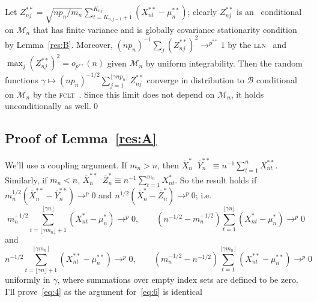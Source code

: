 \documentclass[12pt]{article}
\theoremstyle{definition}
\DeclareMathOperator{\eqd}{\overset{d}{=}}
\newcommand{\fclt}{\textsc{fclt}}
\newcommand{\lln}{\textsc{lln}}
\begin{document}
Let $Z_{nj}^{**} = \sqrt{n p_n/ m_n} \sum_{t = K_{n,j-1} + 1}^{K_{nj}}
(X_{nt}^{**} - \mu_n^{**})$; clearly $Z_{nj}^{**}$ is an \mds\
conditional on $\mathcal{M}_n$ that has finite variance and is
globally covariance stationarity condition by Lemma~\ref{res:B}.
Moreover, $(n p_n)^{-1} \sum_j (Z_{nj}^{**})^2 \to^{p^{**}} 1$ by the
\lln\ \citep[e.g.][Theorem~19.7]{Dav:94} and $\max_j (Z_{nj}^{**})^2 =
o_{p^{**}}(n)$ given $\mathcal{M}_n$ by uniform integrability.  Then
the random functions $\gamma \mapsto (n p_n)^{-1/2}
\sum_{j=1}^{\lfloor \gamma n p_n \rfloor} Z_{nj}^{**}$ converge in
distribution to $\mathcal{B}$ conditional on $\mathcal{M}_n$ by the
\fclt\ \citep[e.g.][Theorem 27.14]{Dav:94}.  Since this limit does not
depend on $\mathcal{M}_n$, it holds unconditionally as well.\qed

\subsection*{Proof of Lemma~\ref{res:A}}
We'll use a coupling argument.  If $m_n > n$, then $\bar{X}_n^{*} \eqd
\bar{Y}_n^{**} \equiv n^{-1} \sum_{t=1}^{n} X_{nt}^{**}$.  Similarly,
if $m_n < n$, $\bar{X}_n^{**} \eqd \bar{Z}_n^{*} \equiv n^{-1}
\sum_{t=1}^{m_n} X_{nt}^{*}$.  So the result holds if $m_n^{1/2}
(\bar{X}_n^{**} - \bar{Y}_n^{**}) \to^p 0$ and $n^{1/2} (\bar{X}_n^{*}
- \bar{Z}_n^{*}) \to^p 0$; i.e.
\begin{equation}\label{eq:4}
  m_n^{-1/2} \sum_{t=\lfloor \gamma m_n \rfloor +
    1}^{\lfloor \gamma n \rfloor} (X_{nt}^{*} - \mu_n^{*}) \to^{p}
  0, \qquad (n^{-1/2} - m_n^{-1/2})
  \sum_{t=1}^{\lfloor \gamma n \rfloor} (X_{nt}^* - \mu_n^*) \to^p 0
\end{equation}
and
\begin{equation}\label{eq:6}
  n^{-1/2} \sum_{t=\lfloor \gamma n \rfloor +
    1}^{\lfloor \gamma m_n \rfloor} (X_{nt}^{**} - \mu_n^{**}) \to^{p} 0, \qquad
  (m_n^{-1/2} - n^{-1/2})
  \sum_{t=1}^{\lfloor \gamma m_n \rfloor} (X_{nt}^{**} - \mu_n^{**}) \to^p 0
\end{equation}
uniformly in $\gamma$, where summations over empty index sets are
defined to be zero.  I'll prove~\eqref{eq:4} as the argument
for~\eqref{eq:6} is identical
\end{document}
